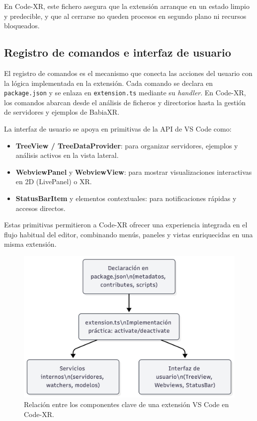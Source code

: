\documentclass[a4paper, 12pt]{book}
\begin{document}
En Code-XR, este fichero asegura que la extensión arranque en un estado limpio y predecible, y que al cerrarse no queden procesos en segundo plano ni recursos bloqueados.

\subsection{Registro de comandos e interfaz de usuario}
El registro de comandos es el mecanismo que conecta las acciones del usuario con la lógica implementada en la extensión. Cada comando se declara en \texttt{package.json} y se enlaza en \texttt{extension.ts} mediante su \emph{handler}. En Code-XR, los comandos abarcan desde el análisis de ficheros y directorios hasta la gestión de servidores y ejemplos de BabiaXR.  

La interfaz de usuario se apoya en primitivas de la API de VS Code como:
\begin{itemize}
  \item \textbf{TreeView / TreeDataProvider}: para organizar servidores, ejemplos y análisis activos en la vista lateral.
  \item \textbf{WebviewPanel} y \textbf{WebviewView}: para mostrar visualizaciones interactivas en 2D (LivePanel) o XR.
  \item \textbf{StatusBarItem} y elementos contextuales: para notificaciones rápidas y accesos directos.
\end{itemize}

Estas primitivas permitieron a Code-XR ofrecer una experiencia integrada en el flujo habitual del editor, combinando menús, paneles y vistas enriquecidas en una misma extensión.

\begin{figure}[H]
\centering
\includegraphics[width=0.8\linewidth]{img/fig-extension-structure.png}
\caption{Relación entre los componentes clave de una extensión VS Code en Code-XR.}
\label{fig:extension-structure}
\end{figure}
\end{document}
